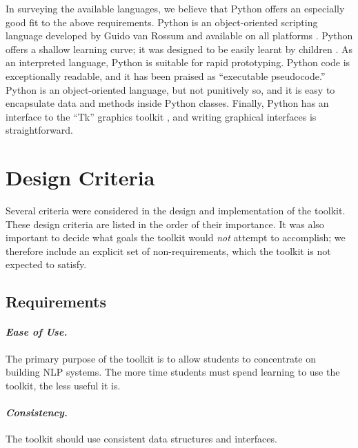 \documentclass[11pt]{article}
\begin{document}
In surveying the available languages, we believe that Python offers an
especially good fit to the above requirements.  Python is an
object-oriented scripting language developed by Guido van Rossum
and available on all platforms \cite{python}.  Python offers a
shallow learning curve; it was designed to be easily learnt by
children \cite{rossum99}.  As an interpreted language, Python is
suitable for rapid prototyping.  Python code is exceptionally
readable, and it has been praised as ``executable pseudocode.''
Python is an object-oriented language, but not punitively so, and it
is easy to encapsulate data and methods inside Python classes.
Finally, Python has an interface to the ``Tk'' graphics toolkit
\cite{tkinter}, and writing graphical interfaces is straightforward.

\section{Design Criteria}
\label{sec:criteria}

Several criteria were considered in the design and implementation of
the toolkit.  These design criteria are listed in the order of their
importance.  It was also important to decide what goals the toolkit
would \emph{not} attempt to accomplish; we therefore include an
explicit set of non-requirements, which the toolkit is not expected to
satisfy.

\subsection{Requirements}

\paragraph{\textit{Ease of Use.}} The primary purpose of the toolkit is
to allow students to concentrate on building NLP systems.  The more
time students must spend learning to use the toolkit, the less useful
it is.

\paragraph{\textit{Consistency.}} The toolkit should use consistent data
structures and interfaces.
\end{document}
